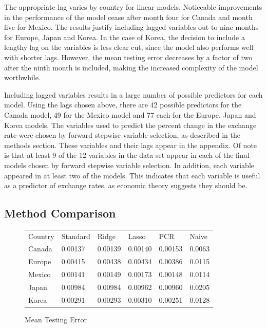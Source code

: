 \documentclass{sig-alternate-05-2015}
\begin{document}
\par{} The appropriate lag varies by country for linear models. Noticeable improvements in the performance of the model cease after month four for Canada and month five for Mexico. The results justify including lagged variables out to nine months for Europe, Japan and Korea. In the case of Korea, the decision to include a lengthy lag on the variables is less clear cut, since the model also performs well with shorter lags. However, the mean testing error decreases by a factor of two after the ninth month is included, making the increased complexity of the model worthwhile.
\par{} Including lagged variables results in a large number of possible predictors for each model. Using the lags chosen above, there are 42 possible predictors for the Canada model, 49 for the Mexico model and 77 each for the Europe, Japan and Korea models. The variables used to predict the percent change in the exchange rate were chosen by forward stepwise variable selection, as described in the methods section. These variables and their lags appear in the appendix. Of note is that at least 9 of the 12 variables in the data set appear in each of the final models chosen by forward stepwise variable selection. In addition, each variable appeared in at least two of the models. This indicates that each variable is useful as a predictor of exchange rates, as economic theory suggests they should be.

\subsection{Method Comparison}

\begin{figure}
\centering
\caption{Mean Testing Error}
\begin{tabular}{l l l l l l}
Country	& Standard 	& Ridge 		& Lasso 		& PCR 		& Naive \\
Canada 	& 0.00137 	& 0.00139 	& 0.00140 	& 0.00153 	& 0.0063 \\
Europe	& 0.00415 	& 0.00438 	& 0.00434 	& 0.00386 	& 0.0115 \\
Mexico	& 0.00141 	& 0.00149 	& 0.00173 	& 0.00148  & 0.0114 \\
Japan	& 0.00984 	& 0.00984 	& 0.00962 	& 0.00960  & 0.0205 \\
Korea	& 0.00291 	& 0.00293 	& 0.00310 	& 0.00251 	& 0.0128 \\
\end{tabular}
\label{tab:comparison}
\end{figure}
\end{document}

